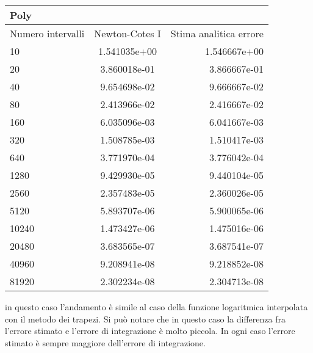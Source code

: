 \begin{center}
 

\begin{longtable}[h]{lcr}
\toprule
Poly & & \\
\midrule
Numero intervalli & Newton-Cotes I & Stima analitica errore  \\
\midrule
10 &	  1.541035e+00  	 & 1.546667e+00 \\  
20 &	  3.860018e-01  	 & 3.866667e-01 \\  
40 &	  9.654698e-02  	 & 9.666667e-02 \\  
80 &	  2.413966e-02  	 & 2.416667e-02 \\  
160 &	  6.035096e-03  	 & 6.041667e-03 \\  
320 &	  1.508785e-03  	 & 1.510417e-03 \\  
640 &	  3.771970e-04  	 & 3.776042e-04 \\  
1280 &	  9.429930e-05  	 & 9.440104e-05 \\  
2560 &	  2.357483e-05  	 & 2.360026e-05 \\  
5120 &	  5.893707e-06  	 & 5.900065e-06 \\  
10240 &	  1.473427e-06  	 & 1.475016e-06 \\  
20480 &	  3.683565e-07  	 & 3.687541e-07 \\  
40960 &	  9.208941e-08  	 & 9.218852e-08 \\  
81920 &	  2.302234e-08  	 & 2.304713e-08 \\  

\bottomrule
\end{longtable}
\end{center}
in questo caso l'andamento è simile al caso della funzione logaritmica interpolata con il metodo dei trapezi.
Si può notare che in questo caso la differenza fra l'errore stimato e l'errore di integrazione è molto piccola.
In ogni caso l'errore stimato è sempre maggiore dell'errore di integrazione.\\
